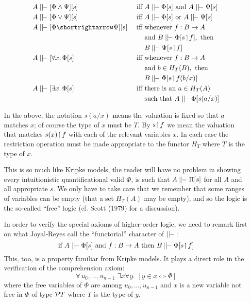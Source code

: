 \begin{align*}
  A & \mm [\Phi \land \Psi] [s] & {\textrm{ iff }} & A \mm \Phi[s] \textrm{ and } A \mm \Psi[s]\\
  A & \mm [\Phi \lor \Psi] [s] & {\textrm{ iff }} & A \mm \Phi[s] \textrm{ or } A \mm \Psi[s]\\
  A & \mm [\Phi \imp \Psi] [s] & {\textrm{ iff }} & \textrm{whenever } f:\BA\\
  &&& \textrm{and } B \mm \Phi[s \res f], \textrm{ then} \\
  &&& B \mm \Psi[s \res f]\\
  A & \mm [\forall x.\, \Phi [s] & {\textrm{ iff }} & \textrm{whenever } f:\BA\\
  &&& \textrm{and } b \in H_{T}(B), \textrm{ then} \\
  &&& B \mm \Phi[s \res f (b/x)]\\
  A & \mm [\exists x.\, \Phi [s] & {\textrm{ iff }} & \textrm{there is an } a \in H_T(A)\\
  &&& \textrm{such that } A \mm \Phi[s(a/x)]\\
\end{align*}

In the above, the notation $s(a/x)$ means the valuation is fixed
so that $a$ matches $x$; of course the type of $x$ must be $T$. By $s \res f$ we mean the valuation that matches $s(x)\res f$ with each of the relevant variables $x$. In each case the restriction operation must be made appropriate to the functor $H_T$ where $T$ is the type of $x$.

This is so much like Kripke models, the reader will have no problem in showing every intuitionistic quantificational valid $\Phi$, is such that $A \mm \Pi[s]$ for all $A$ and all appropriate $s$. We only have to take care that we remember that some ranges of variables can be empty (that a set $H_T(A)$ may be empty), and so the logic is the so-called ``free'' logic (cf. Scott (1979) for a discussion).

In order to verify the special axioms of higher-order logic, we need to remark first on what Joyal-Reyes call the ``functorial'' character of $\mm$ :
$$
\textrm{if } A\mm\Phi[s] \textrm{ and } f:\BA \textrm{ then } B \mm \Phi[s \res f]
$$
This, too, is a property familiar from Kripke models. It plays a direct role in the verification of the comprehension axiom:
$$
\forall\, u_0, \dots, u_{n-1} \,\, \exists x \forall y .\,\,  [ y \in x \iff \Phi]
$$
where the free variables of $\Phi$ are among $u_0, \dots, u_{n-1}$ and $x$ is a new variable not free in $\Phi$ of type $\P T$ where $T$ is the type of $y$.

